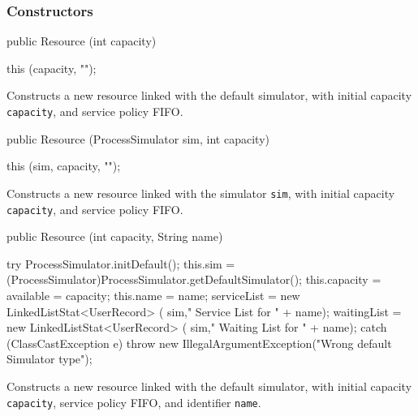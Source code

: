 \subsubsection* {Constructors}
\begin{code}

   public Resource (int capacity) \begin{hide} {
      this (capacity, "");
   }\end{hide}
\end{code}
\begin{tabb}  Constructs a new resource linked with the default simulator,
  with initial capacity \texttt{capacity}, and service policy FIFO.
\end{tabb}
\begin{htmlonly}
\end{htmlonly}
\begin{code}

   public Resource (ProcessSimulator sim, int capacity) \begin{hide} {
      this (sim, capacity, "");
   }\end{hide}
\end{code}
\begin{tabb}  Constructs a new resource linked with the simulator
 \texttt{sim}, with initial capacity \texttt{capacity}, and service policy FIFO.
\end{tabb}
\begin{htmlonly}
\end{htmlonly}
\begin{code}

   public Resource (int capacity, String name) \begin{hide} {
      try {
         ProcessSimulator.initDefault();
         this.sim = (ProcessSimulator)ProcessSimulator.getDefaultSimulator();
         this.capacity = available = capacity;
         this.name = name;
         serviceList = new LinkedListStat<UserRecord> (
              sim," Service List for " + name);
         waitingList = new LinkedListStat<UserRecord> (
              sim," Waiting List for " + name);
      }
      catch (ClassCastException e) {
         throw new IllegalArgumentException("Wrong default Simulator type");
      }
   }\end{hide}
\end{code}
\begin{tabb} Constructs a new resource linked with the default simulator, with
 initial capacity \texttt{capacity}, service policy FIFO, and identifier 
 \texttt{name}.
\end{tabb}
